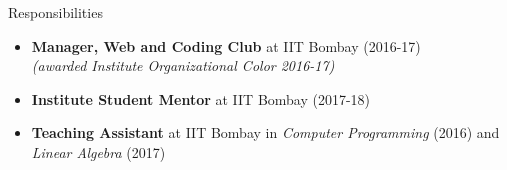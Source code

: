 \documentclass{resume} %
\begin{document}
\vspace*{-1.5mm}
\begin{rSection}{Responsibilities}
\begin{itemize}[leftmargin=*]
\itemsep -0.5em 
\item \textbf{Manager, Web and Coding Club} at IIT Bombay (2016-17)\\ \textit{(awarded Institute Organizational Color 2016-17)}
\item \textbf{Institute Student Mentor} at IIT Bombay (2017-18)
\item \textbf{Teaching Assistant} at IIT Bombay in \textit{Computer Programming} (2016) and \textit{Linear Algebra} (2017)
\end{itemize}
\end{rSection}
\end{document}
